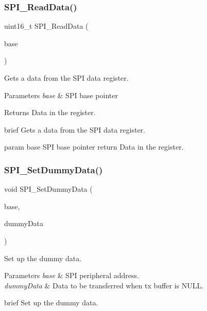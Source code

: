\subsubsection{\texorpdfstring{SPI\_ReadData()}{SPI\_ReadData()}}
{\footnotesize\ttfamily uint16\+\_\+t S\+P\+I\+\_\+\+Read\+Data (\begin{DoxyParamCaption}\item[{\mbox{\hyperlink{struct_s_p_i___type}{S\+P\+I\+\_\+\+Type}} $\ast$}]{base }\end{DoxyParamCaption})}



Gets a data from the S\+PI data register. 


\begin{DoxyParams}{Parameters}
{\em base} & S\+PI base pointer \\
\hline
\end{DoxyParams}
\begin{DoxyReturn}{Returns}
Data in the register.
\end{DoxyReturn}
brief Gets a data from the S\+PI data register.

param base S\+PI base pointer return Data in the register. \mbox{\label{group__spi__driver_gaa381d274dba2ce9257cdf4be5ec17662}} 
\subsubsection{\texorpdfstring{SPI\_SetDummyData()}{SPI\_SetDummyData()}}
{\footnotesize\ttfamily void S\+P\+I\+\_\+\+Set\+Dummy\+Data (\begin{DoxyParamCaption}\item[{\mbox{\hyperlink{struct_s_p_i___type}{S\+P\+I\+\_\+\+Type}} $\ast$}]{base,  }\item[{uint8\+\_\+t}]{dummy\+Data }\end{DoxyParamCaption})}



Set up the dummy data. 


\begin{DoxyParams}{Parameters}
{\em base} & S\+PI peripheral address. \\
\hline
{\em dummy\+Data} & Data to be transferred when tx buffer is N\+U\+LL.\\
\hline
\end{DoxyParams}
brief Set up the dummy data.

